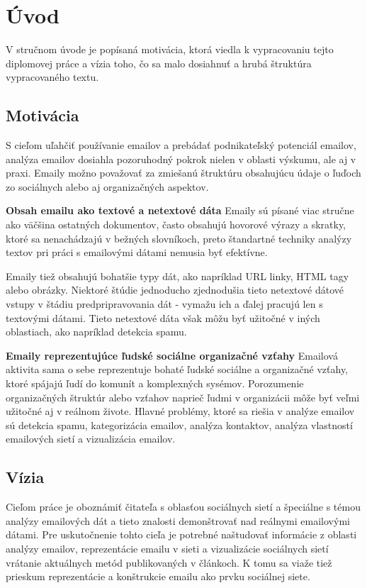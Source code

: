 \documentclass[slovak,master,public,dept460,male,cpdeclaration,oneside]{diploma}
\begin{document}
\MakeTitlePages


\section{Úvod}
V stručnom úvode je popísaná motivácia, ktorá viedla k vypracovaniu tejto diplomovej práce a vízia toho, čo sa malo dosiahnuť a hrubá štruktúra vypracovaného textu.

\subsection{Motivácia}
S cieľom uľahčiť používanie emailov a prebádať podnikateľský potenciál emailov, analýza emailov dosiahla pozoruhodný pokrok nielen v oblasti výskumu, ale aj v praxi. Emaily možno považovať za zmiešanú štruktúru obsahujúcu údaje o ľuďoch zo sociálnych alebo aj organizačných aspektov.

\textbf{Obsah emailu ako textové a netextové dáta} 
\newline Emaily sú písané viac stručne ako väčšina ostatných dokumentov, často obsahujú hovorové výrazy a skratky, ktoré sa nenachádzajú v bežných slovníkoch, preto štandartné techniky analýzy textov pri práci s emailovými dátami  nemusia byť efektívne.

Emaily tiež obsahujú bohatšie typy dát, ako napríklad URL linky, HTML tagy alebo obrázky. Niektoré štúdie jednoducho zjednodušia tieto netextové dátové vstupy v štádiu predpripravovania dát - vymažu ich a ďalej pracujú len s textovými dátami. Tieto netextové dáta však môžu byť užitočné v iných oblastiach, ako napríklad detekcia spamu. 


\textbf{Emaily reprezentujúce ľudské sociálne organizačné vzťahy} 
\newline Emailová aktivita sama o sebe reprezentuje bohaté ľudské sociálne a organizačné vzťahy, ktoré spájajú ľudí do komunít a komplexných sysémov. Porozumenie organizačných štruktúr alebo vzťahov naprieč ľudmi v organizácii môže byť veľmi užitočné aj v reálnom živote. 
Hlavné problémy, ktoré sa riešia v analýze emailov sú detekcia spamu, kategorizácia emailov, analýza kontaktov, analýza vlastností emailových sietí a vizualizácia emailov.

\subsection{Vízia}
Cieľom práce je oboznámiť čitateľa s oblasťou sociálnych sietí a špeciálne s témou analýzy emailových dát a tieto znalosti demonštrovať nad reálnymi emailovými dátami. Pre uskutočnenie tohto cieľa je potrebné naštudovať informácie z oblasti analýzy emailov, reprezentácie emailu v sieti a vizualizácie sociálnych sietí vrátanie aktuálnych metód publikovaných v článkoch. \newline K tomu sa viaže tiež prieskum reprezentácie a konštrukcie emailu ako prvku sociálnej siete. 
\end{document}
